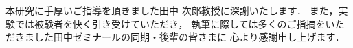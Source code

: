 本研究に手厚いご指導を頂きました田中 次郎教授に深謝いたします．
また，実験では被験者を快く引き受けていただき，
執筆に際しては多くのご指摘をいただきました田中ゼミナールの同期・後輩の皆さまに
心より感謝申し上げます．
